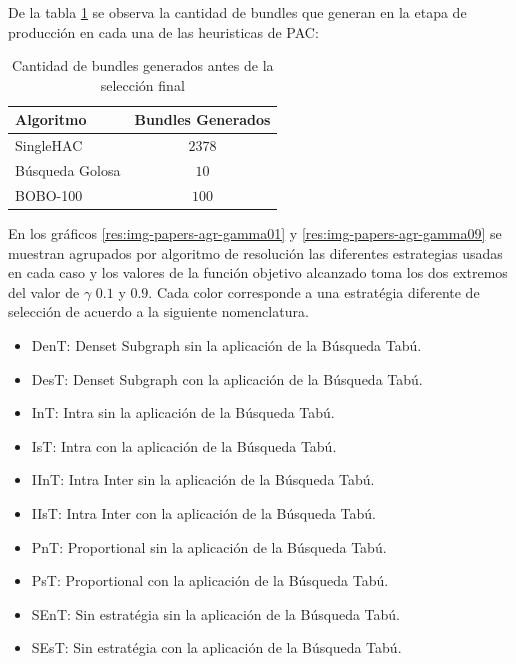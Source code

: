 De la tabla \ref{res:tbl-cant-bundles} se observa la cantidad de bundles que generan en la etapa de producción en cada una de las heuristicas de PAC:\\
\begin{table}[h]
  \centering
  \resizebox{0.5\textwidth}{!} {
    \begin{tabular}{|lc|}
    \hline
    Algoritmo & Bundles Generados \\
    \hline
    SingleHAC & $2378$ \\
    Búsqueda Golosa & $10$ \\
    BOBO-100 & $100$ \\
    \hline
    \end{tabular}
  }
    \caption {Cantidad de bundles generados antes de la selección final}
    \label{res:tbl-cant-bundles}
\end{table}
\newpage

En los gráficos \ref{res:img-papers-agr-gamma01} y \ref{res:img-papers-agr-gamma09} se muestran agrupados por algoritmo de resolución las diferentes estrategias usadas en cada caso y los valores de la función objetivo alcanzado toma los dos extremos del valor de $\gamma$ $0.1$ y $0.9$. Cada color corresponde a una estratégia diferente de selección de acuerdo a la siguiente nomenclatura.
\begin{itemize}
 \item DenT: Denset Subgraph sin la aplicación de la Búsqueda Tabú.
 \item DesT: Denset Subgraph con la aplicación de la Búsqueda Tabú.
 \item InT: Intra sin la aplicación de la Búsqueda Tabú.
 \item IsT: Intra con la aplicación de la Búsqueda Tabú.
 \item IInT: Intra Inter sin la aplicación de la Búsqueda Tabú.
 \item IIsT: Intra Inter con la aplicación de la Búsqueda Tabú.
 \item PnT: Proportional sin la aplicación de la Búsqueda Tabú.
 \item PsT: Proportional con la aplicación de la Búsqueda Tabú.
 \item SEnT: Sin estratégia sin la aplicación de la Búsqueda Tabú.
 \item SEsT: Sin estratégia con la aplicación de la Búsqueda Tabú.
\end{itemize}

